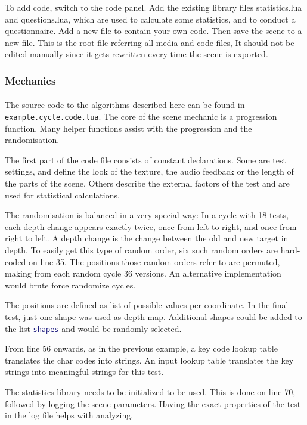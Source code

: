 To add code, switch to the code panel.
Add the existing library files statistics.lua and questions.lua, which are used to calculate some statistics, and to conduct a questionnaire.
Add a new file to contain your own code.
Then save the scene to a new file.
This is the root file referring all media and code files, It should not be edited manually since it gets rewritten every time the scene is exported.

\subsubsection{Mechanics}
\paragraph{}
The source code to the algorithms described here can be found in \texttt{example.\-cycle.\-code.lua}.
The core of the scene mechanic is a progression function.
Many helper functions assist with the progression and the randomisation.

The first part of the code file consists of constant declarations.
Some are test settings, and define the look of the texture, the audio feedback or the length of the parts of the scene.
Others describe the external factors of the test and are used for statistical calculations.

The randomisation is balanced in a very special way:
In a cycle with 18 tests, each depth change appears exactly twice, once from left to right, and once from right to left.
A depth change is the change between the old and new target in depth.
To easily get this type of random order, six such random orders are hard-coded on line 35.
The positions those random orders refer to are permuted, making from each random cycle 36 versions.
An alternative implementation would brute force randomize cycles.

The positions are defined as list of possible values per coordinate.
In the final test, just one shape was used as depth map.
Additional shapes could be added to the list \lstinline[language=lua]{shapes} and would be randomly selected.

From line 56 onwards, as in the previous example, a key code lookup table translates the char codes into strings.
An input lookup table translates the key strings into meaningful strings for this test.

The statistics library needs to be initialized to be used.
This is done on line 70, followed by logging the scene parameters.
Having the exact properties of the test in the log file helps with analyzing.


